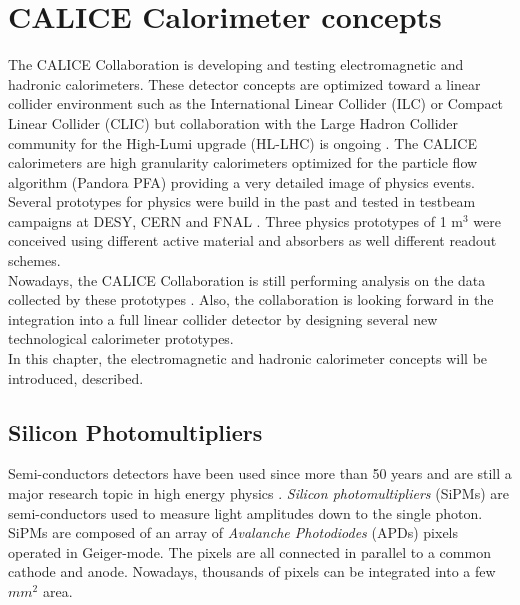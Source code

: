 \chapter{CALICE Calorimeter concepts}
\label{chap:CALICE_Det}

The CALICE Collaboration is developing and testing electromagnetic and hadronic calorimeters. These detector concepts are optimized toward a linear collider environment such as the International Linear Collider (ILC) \cite{ILC_TDR_Vol1} or Compact Linear Collider (CLIC) \cite{CLIC_CDR} but collaboration with the Large Hadron Collider community for the High-Lumi upgrade (HL-LHC) is ongoing \cite{1748-0221-12-01-C01042}. The CALICE calorimeters are high granularity calorimeters optimized for the particle flow algorithm (Pandora PFA) providing a very detailed image of physics events.\\
Several prototypes for physics were build in the past and tested in testbeam campaigns at DESY, CERN and FNAL \cite{1748-0221-3-08-P08001, 1748-0221-5-05-P05004, 1707.07126v2, 1748-0221-10-10-P10039, 1748-0221-3-05-P05001}. Three physics prototypes of 1 m$^3$ were conceived using different active material and absorbers as well different readout schemes.\\
Nowadays, the CALICE Collaboration is still performing analysis on the data collected by these prototypes \cite{OskarCAN, YasmineCAN}. Also, the collaboration is looking forward in the integration into a full linear collider detector by designing several new technological calorimeter prototypes.\\
In this chapter, the electromagnetic and hadronic calorimeter concepts will be introduced, described.

\section{Silicon Photomultipliers}

Semi-conductors detectors have been used since more than 50 years and are still a major research topic in high energy physics \cite{1748-0221-4-04-P04004, Garutti:2011qv, Garutti:2017ipx}. \textit{Silicon photomultipliers} (SiPMs) are semi-conductors used to measure light amplitudes down to the single photon. SiPMs are composed of an array of \textit{Avalanche Photodiodes} (APDs) pixels operated in Geiger-mode. The pixels are all connected in parallel to a common cathode and anode. Nowadays, thousands of pixels can be integrated into a few $mm^2$ area.

